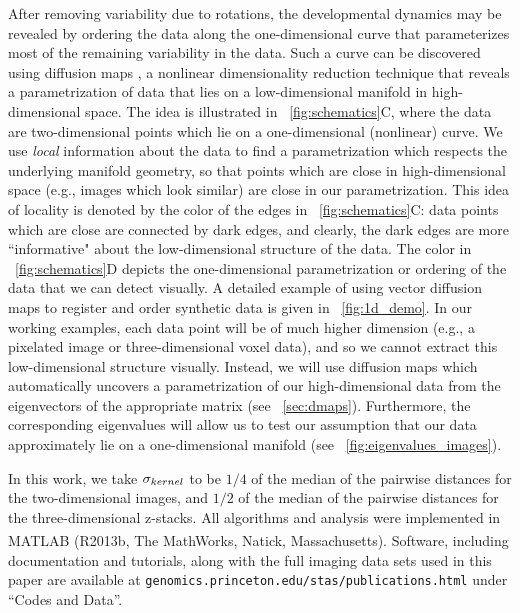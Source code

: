 After removing variability due to rotations, the developmental dynamics may be revealed by ordering the data along the one-dimensional curve that parameterizes most of the remaining variability in the data.
%
Such a curve can be discovered using diffusion maps \citep{coifman2005geometric}, a nonlinear dimensionality reduction technique that reveals a parametrization of data that lies on a low-dimensional manifold in high-dimensional space.
%
The idea is illustrated in \fig~\ref{fig:schematics}C, where the data are two-dimensional points which lie on a one-dimensional (nonlinear) curve.
%
We use {\it local} information about the data to find a parametrization which respects the underlying manifold geometry, so that points which are close in high-dimensional space (e.g., images which look similar) are close in our parametrization.
%
This idea of locality is denoted by the color of the edges in \fig~\ref{fig:schematics}C:
data points which are close are connected by dark edges, and clearly, the dark edges are more ``informative" about the low-dimensional structure of the data.
%
The color in \fig~\ref{fig:schematics}D depicts the one-dimensional parametrization or ordering of the data that we can detect visually.
%
A detailed example of using vector diffusion maps to register and order synthetic data is given in \fig~\ref{fig:1d_demo}.
%
In our working examples, each data point will be of much higher dimension (e.g., a pixelated image or three-dimensional voxel data), and so we cannot extract this low-dimensional structure visually.
%
Instead, we will use diffusion maps which automatically uncovers a parametrization of our high-dimensional data from the eigenvectors of the appropriate matrix (see \sec~\ref{sec:dmaps}).
%
Furthermore, the corresponding eigenvalues will allow us to test our assumption that our data approximately lie on a one-dimensional manifold (see \fig~\ref{fig:eigenvalues_images}).


In this work, we take $\sigma_{kernel}$ to be $1/4$ of the median of the pairwise distances for the two-dimensional images, and $1/2$ of the median of the pairwise distances for the three-dimensional z-stacks.
%
All algorithms and analysis were implemented in MATLAB\textsuperscript{\textregistered} (R2013b, The MathWorks, Natick, Massachusetts).
%
Software, including documentation and tutorials, along with the full imaging data sets used in this paper are available at \texttt{genomics.princeton.edu/stas/publications.html} under ``Codes and Data''.


